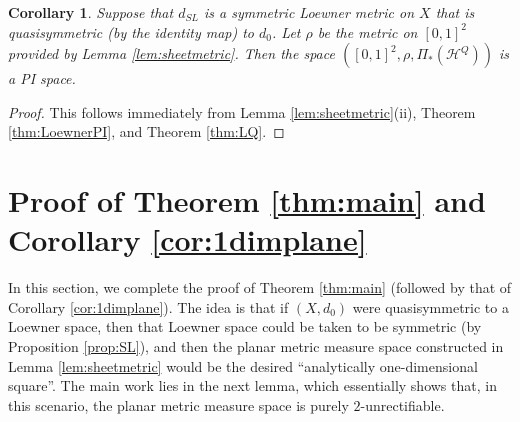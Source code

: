 \documentclass{amsart}
\theoremstyle{plain}
\newtheorem{corollary}[theorem]{Corollary}
\theoremstyle{definition}
\numberwithin{equation}{section}
\numberwithin{theorem}{section}
\begin{document}
\begin{corollary}\label{cor:sheetPI}
Suppose that $d_{SL}$ is a symmetric Loewner metric on $X$ that is quasisymmetric (by the identity map) to $d_0$. Let $\rho$ be the metric on $[0,1]^2$ provided by Lemma \ref{lem:sheetmetric}. Then the space $([0,1]^2,\rho, \Pi_*(\mathcal{H}^Q))$ is a PI space.
\end{corollary}
\begin{proof}
This follows immediately from Lemma \ref{lem:sheetmetric}(ii), Theorem \ref{thm:LoewnerPI}, and Theorem \ref{thm:LQ}.
\end{proof}

\section{Proof of Theorem \ref{thm:main} and Corollary \ref{cor:1dimplane}}\label{sec:mainproof}
In this section, we complete the proof of Theorem \ref{thm:main} (followed by that of Corollary \ref{cor:1dimplane}). The idea is that if $(X,d_0)$ were quasisymmetric to a Loewner space, then that Loewner space could be taken to be symmetric (by Proposition \ref{prop:SL}), and then the planar metric measure space constructed in Lemma \ref{lem:sheetmetric} would be the desired ``analytically one-dimensional square''. The main work lies in the next lemma, which essentially shows that, in this scenario, the planar metric measure space is purely $2$-unrectifiable.
\end{document}

